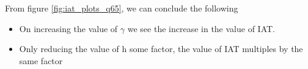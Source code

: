 \documentclass[11pt]{article}
\begin{document}
From figure \ref{fig:iat_plots_q65}, we can conclude the following
\begin{itemize}
	\item On increasing the value of $\gamma$ we see the increase in the value of IAT.
	\item Only reducing the value of h some factor, the value of IAT multiples by the same factor
\end{itemize}
\end{document}
